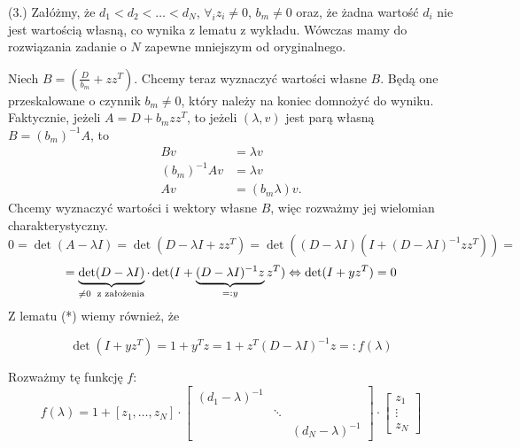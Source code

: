 \documentclass[a4paper,12pt]{article}
\begin{document}
(3.) Załóżmy, że $d_1 < d_2 < \dots < d_N$, $\forall_i z_i \neq 0$, $b_m \neq 0$ oraz, że żadna
wartość $d_i$ nie jest wartością własną, co wynika z lematu z wykładu.
Wówczas mamy do rozwiązania zadanie o $N$ zapewne mniejszym od oryginalnego.

Niech $B = (\frac{D}{b_m} + zz^T)$.
Chcemy teraz wyznaczyć wartości własne $B$. Będą one przeskalowane o czynnik $b_m \neq 0$, który
należy na koniec domnożyć do wyniku. Faktycznie, jeżeli $A = D + b_m zz^T$, to jeżeli $(\lambda, v)$
jest parą własną $B = (b_m)^{-1}A$, to
\begin{align*}
    Bv           & = \lambda v        \\
    (b_m)^{-1}Av & = \lambda v        \\
    Av           & = (b_m \lambda) v.
\end{align*}
Chcemy wyznaczyć wartości i wektory własne $B$, więc rozważmy
jej wielomian charakterystyczny.
$$
    0 = \det(A - \lambda I) = \det(D - \lambda I + zz^T) = \det((D - \lambda I)(I + (D - \lambda I)^{-1}zz^T)) = $$$$ =
    \underbrace{\det(D - \lambda I)}_{\neq 0 \text{ \;z założenia}} \cdot
    \det(I + \underbrace{(D - \lambda I)^{-1} z}_{=:y} z^T) \Leftrightarrow \det(I + yz^T) = 0
$$
Z lematu (*) wiemy również, że

$$
    \det(I + yz^T) = 1 + y^Tz = 1 + z^T(D - \lambda I)^{-1} z=: f(\lambda)
$$

Rozważmy tę funkcję $f$:
$$
    f(\lambda) = 1 + [z_1, \dots, z_N] \cdot \begin{bmatrix}
        (d_1 - \lambda)^{-1} &        &                      \\
                             & \ddots &                      \\
                             &        & (d_N - \lambda)^{-1}
    \end{bmatrix}
    \cdot
    \begin{bmatrix}
        z_1    \\
        \vdots \\
        z_N
    \end{bmatrix}
$$
\end{document}
